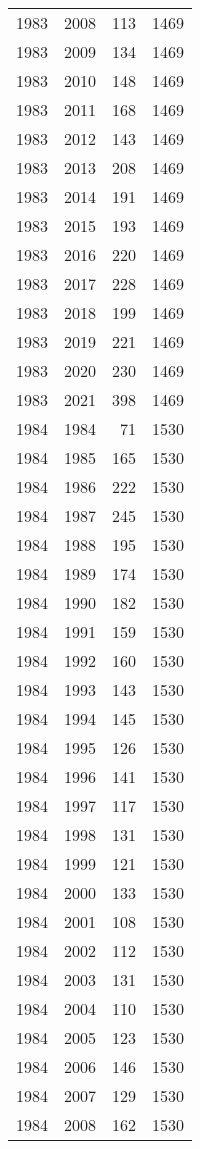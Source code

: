 \documentclass[
  10pt,
  letterpaper,
  DIV=11,
  numbers=noendperiod,
  twoside]{scrartcl}
\begin{document}
\begin{longtable}[]{@{}rrrr@{}}
1983 & 2008 & 113 & 1469 \\
1983 & 2009 & 134 & 1469 \\
1983 & 2010 & 148 & 1469 \\
1983 & 2011 & 168 & 1469 \\
1983 & 2012 & 143 & 1469 \\
1983 & 2013 & 208 & 1469 \\
1983 & 2014 & 191 & 1469 \\
1983 & 2015 & 193 & 1469 \\
1983 & 2016 & 220 & 1469 \\
1983 & 2017 & 228 & 1469 \\
1983 & 2018 & 199 & 1469 \\
1983 & 2019 & 221 & 1469 \\
1983 & 2020 & 230 & 1469 \\
1983 & 2021 & 398 & 1469 \\
1984 & 1984 & 71 & 1530 \\
1984 & 1985 & 165 & 1530 \\
1984 & 1986 & 222 & 1530 \\
1984 & 1987 & 245 & 1530 \\
1984 & 1988 & 195 & 1530 \\
1984 & 1989 & 174 & 1530 \\
1984 & 1990 & 182 & 1530 \\
1984 & 1991 & 159 & 1530 \\
1984 & 1992 & 160 & 1530 \\
1984 & 1993 & 143 & 1530 \\
1984 & 1994 & 145 & 1530 \\
1984 & 1995 & 126 & 1530 \\
1984 & 1996 & 141 & 1530 \\
1984 & 1997 & 117 & 1530 \\
1984 & 1998 & 131 & 1530 \\
1984 & 1999 & 121 & 1530 \\
1984 & 2000 & 133 & 1530 \\
1984 & 2001 & 108 & 1530 \\
1984 & 2002 & 112 & 1530 \\
1984 & 2003 & 131 & 1530 \\
1984 & 2004 & 110 & 1530 \\
1984 & 2005 & 123 & 1530 \\
1984 & 2006 & 146 & 1530 \\
1984 & 2007 & 129 & 1530 \\
1984 & 2008 & 162 & 1530 \\

\end{longtable}
\end{document}
